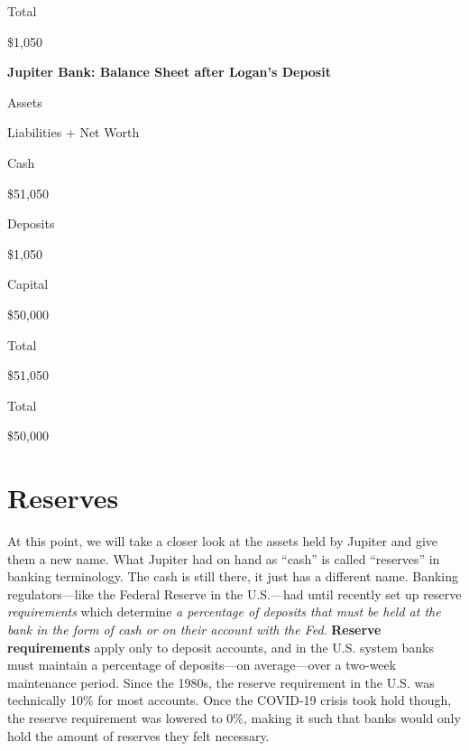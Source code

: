 \documentclass[
]{book}
\begin{document}
Total

\$1,050

\label{tab:t6}\textbf{Jupiter Bank: Balance Sheet after Logan's Deposit}

Assets

Liabilities + Net Worth

Cash

\$51,050

Deposits

\$1,050

Capital

\$50,000

Total

\$51,050

Total

\$50,000

\hypertarget{reserves}{%
\section{Reserves}\label{reserves}}

At this point, we will take a closer look at the assets held by Jupiter and give them a new name. What Jupiter had on hand as ``cash'' is called ``reserves'' in banking terminology. The cash is still there, it just has a different name. Banking regulators---like the Federal Reserve in the U.S.---had until recently set up reserve \emph{requirements} which determine \emph{a percentage of deposits that must be held at the bank in the form of cash or on their account with the Fed}. \textbf{Reserve requirements} apply only to deposit accounts, and in the U.S. system banks must maintain a percentage of deposits---on average---over a two-week maintenance period. Since the 1980s, the reserve requirement in the U.S. was technically 10\% for most accounts. Once the COVID-19 crisis took hold though, the reserve requirement was lowered to 0\%, making it such that banks would only hold the amount of reserves they felt necessary.
\end{document}
